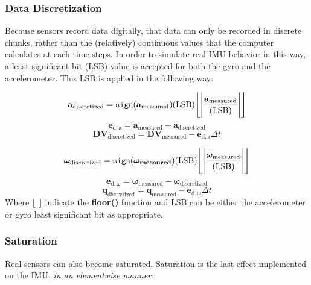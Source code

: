 \subsubsection{Data Discretization}
Because sensors record data digitally, that data can only be recorded in discrete chunks, rather than the (relatively) continuous values that the computer calculates at each time steps. In order to simulate real IMU behavior in this way, a least significant bit (LSB) value is accepted for both the gyro and the accelerometer. This LSB is applied in the following way:

\begin{equation}
\mathbf{a}_{\mathrm{discretized}} = \verb|sign|(\mathbf{a}_\mathrm{measured})(\mathrm{LSB})\Biggl\lfloor\Biggl|\frac{\mathbf{a}_{\mathrm{measured}}}{(\mathrm{LSB})}\Biggr|\Biggr\rfloor
\end{equation}
\begin{equation}
\mathbf{e}_{\mathrm{d},\mathrm{a}} = \mathbf{a}_{\mathrm{measured}} - \mathbf{a}_{\mathrm{discretized}}
\end{equation}
\begin{equation}
\mathbf{DV}_{\mathrm{discretized}} = \mathbf{DV}_{\mathrm{measured}} -\mathbf{e}_{\mathrm{d},\mathrm{a}} \Delta t
\end{equation}

\begin{equation}
\bm{\omega}_{\mathrm{discretized}} = \verb|sign|(\bm{\bm{\omega}_\mathrm{measured}})(\mathrm{LSB})\Biggl\lfloor\Biggl|\frac{\bm{\omega}_{\mathrm{measured}}}{(\mathrm{LSB})}\Biggr|\Biggr\rfloor
\end{equation}
\begin{equation}
\mathbf{e}_{\mathrm{d},\omega} =\bm{\omega}_{\mathrm{measured}} - \bm{\omega}_{\mathrm{discretized}}
\end{equation}
\begin{equation}
\mathbf{q}_{\mathrm{discretized}} = \mathbf{q}_{\mathrm{measured}} - \mathbf{e}_{\mathrm{d},\mathrm{\omega}}\Delta t
\end{equation}
Where $\lfloor$  $\rfloor$ indicate the \textbf{floor()} function and LSB can be either the accelerometer or gyro least significant bit as appropriate.

\subsubsection{Saturation}
Real sensors can also become saturated. Saturation is the last effect implemented on the IMU, \textit{in an elementwise manner}:

